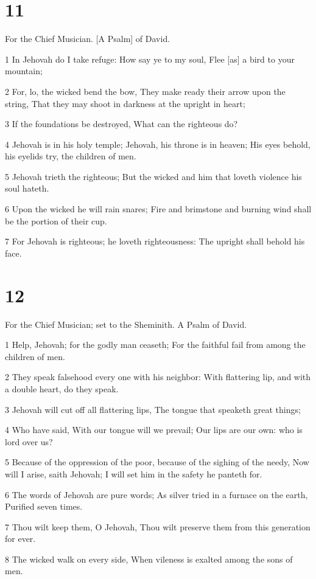 \chapter{11}

\par For the Chief Musician. [A Psalm] of David.

\par 1 In Jehovah do I take refuge: How say ye to my soul, Flee [as] a bird to your mountain;
\par 2 For, lo, the wicked bend the bow, They make ready their arrow upon the string, That they may shoot in darkness at the upright in heart;
\par 3 If the foundations be destroyed, What can the righteous do?
\par 4 Jehovah is in his holy temple; Jehovah, his throne is in heaven; His eyes behold, his eyelids try, the children of men.
\par 5 Jehovah trieth the righteous; But the wicked and him that loveth violence his soul hateth.
\par 6 Upon the wicked he will rain snares; Fire and brimstone and burning wind shall be the portion of their cup.
\par 7 For Jehovah is righteous; he loveth righteousness: The upright shall behold his face.

\chapter{12}

\par For the Chief Musician; set to the Sheminith. A Psalm of David.

\par 1 Help, Jehovah; for the godly man ceaseth; For the faithful fail from among the children of men.
\par 2 They speak falsehood every one with his neighbor: With flattering lip, and with a double heart, do they speak.
\par 3 Jehovah will cut off all flattering lips, The tongue that speaketh great things;
\par 4 Who have said, With our tongue will we prevail; Our lips are our own: who is lord over us?
\par 5 Because of the oppression of the poor, because of the sighing of the needy, Now will I arise, saith Jehovah; I will set him in the safety he panteth for.
\par 6 The words of Jehovah are pure words; As silver tried in a furnace on the earth, Purified seven times.
\par 7 Thou wilt keep them, O Jehovah, Thou wilt preserve them from this generation for ever.
\par 8 The wicked walk on every side, When vileness is exalted among the sons of men.

